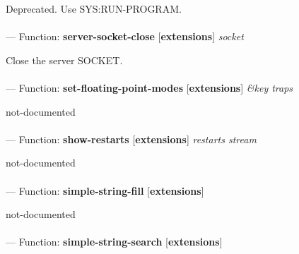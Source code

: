 \begin{adjustwidth}{5em}{5em}
Deprecated.  Use SYS:RUN-PROGRAM.
\end{adjustwidth}

\paragraph{}
\label{EXTENSIONS:SERVER-SOCKET-CLOSE}
--- Function: \textbf{server-socket-close} [\textbf{extensions}] \textit{socket}

\begin{adjustwidth}{5em}{5em}
Close the server SOCKET.
\end{adjustwidth}

\paragraph{}
\label{EXTENSIONS:SET-FLOATING-POINT-MODES}
--- Function: \textbf{set-floating-point-modes} [\textbf{extensions}] \textit{\&key traps}

\begin{adjustwidth}{5em}{5em}
not-documented
\end{adjustwidth}

\paragraph{}
\label{EXTENSIONS:SHOW-RESTARTS}
--- Function: \textbf{show-restarts} [\textbf{extensions}] \textit{restarts stream}

\begin{adjustwidth}{5em}{5em}
not-documented
\end{adjustwidth}

\paragraph{}
\label{EXTENSIONS:SIMPLE-STRING-FILL}
--- Function: \textbf{simple-string-fill} [\textbf{extensions}] \textit{}

\begin{adjustwidth}{5em}{5em}
not-documented
\end{adjustwidth}

\paragraph{}
\label{EXTENSIONS:SIMPLE-STRING-SEARCH}
--- Function: \textbf{simple-string-search} [\textbf{extensions}] \textit{}

